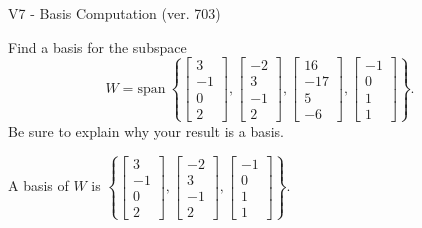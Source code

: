 \begin{exercise}
  \begin{exerciseTitle}V7 - Basis Computation (ver. 703)\end{exerciseTitle}
  \begin{exerciseStatement}
    Find a basis for the subspace 
\[W=\mathrm{span}\ \left\{\left[\begin{array}{r}
3 \\
-1 \\
0 \\
2
\end{array}\right] , \left[\begin{array}{r}
-2 \\
3 \\
-1 \\
2
\end{array}\right] , \left[\begin{array}{r}
16 \\
-17 \\
5 \\
-6
\end{array}\right] , \left[\begin{array}{r}
-1 \\
0 \\
1 \\
1
\end{array}\right]\right\}.\]
 Be sure to explain why your result is a basis.


  \end{exerciseStatement}
  \begin{exerciseAnswer}
   A basis of \(W\) is  \(\left\{\left[\begin{array}{r}
3 \\
-1 \\
0 \\
2
\end{array}\right] , \left[\begin{array}{r}
-2 \\
3 \\
-1 \\
2
\end{array}\right] , \left[\begin{array}{r}
-1 \\
0 \\
1 \\
1
\end{array}\right]\right\}\).
  


  \end{exerciseAnswer}
\end{exercise}